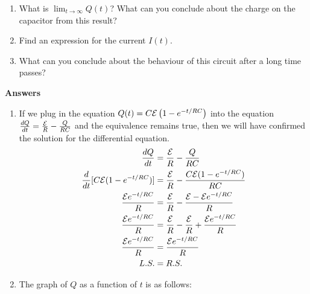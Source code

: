 \documentclass{article}
\begin{document}
\begin{enumerate}
\begin{enumerate}
\item What is $\lim_{t\to \infty} Q(t)$? What can you conclude about the charge on the capacitor from this result?

\item Find an expression for the current $I(t)$. 

\item What can you conclude about the behaviour of this circuit after a long time passes?
\end{enumerate}



\color{blue}
\textbf{Answers}
\begin{enumerate}
    \item
    If we plug in the equation $Q(t) = C{{\cal E}\left(1-e^{-t/RC}\right)}$ into the equation $\frac{dQ}{dt} = \frac{{\cal E}}{R} - \frac{Q}{RC}$ and the equivalence remains true, then we will have confirmed the solution for the differential equation.
    \begin{align*}
    \frac{dQ}{dt} &= \frac{{\cal E}}{R} - \frac{Q}{RC} \\
    \frac{d}{dt}[C{\cal E}(1-e^{-t/RC})] &= \frac{{\cal E}}{R} -  \frac{C{\cal E}(1-e^{-t/RC})}{RC}\\
    \frac{{\cal E}e^{-t/RC}}{R} &= \frac{{\cal E}}{R} - \frac{{\cal E} - {\cal E}e^{-t/RC}}{R} \\
    \frac{{\cal E}e^{-t/RC}}{R} &= \frac{{\cal E}}{R} - \frac{{\cal E}}{R} + \frac{{\cal E}e^{-t/RC}}{R}\\
    \frac{{\cal E}e^{-t/RC}}{R} &= \frac{{\cal E}e^{-t/RC}}{R}\\
    L.S. &= R.S.
    \end{align*}
    \item The graph of $Q$ as a function of $t$ is as follows:
    

\end{enumerate}
\end{enumerate}
\end{document}
